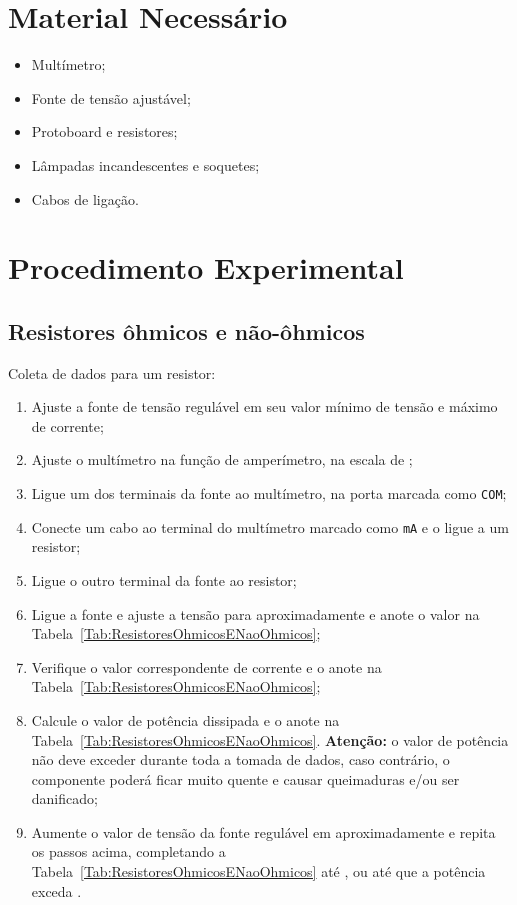 \section{Material Necessário}

\begin{itemize}
	\item Multímetro;
	\item Fonte de tensão ajustável;
	\item Protoboard e resistores;
	\item Lâmpadas incandescentes e soquetes; 
	\item Cabos de ligação.
\end{itemize}

\section{Procedimento Experimental}

\subsection{Resistores ôhmicos e não-ôhmicos}

Coleta de dados para um resistor:
\begin{enumerate}
	\item Ajuste a fonte de tensão regulável em seu valor mínimo de tensão e máximo de corrente; 
	\item Ajuste o multímetro na função de amperímetro, na escala de ;
	\item Ligue um dos terminais da fonte ao multímetro, na porta marcada como \texttt{COM};
	\item Conecte um cabo ao terminal do multímetro marcado como \texttt{mA} e o ligue a um resistor;
	\item Ligue o outro terminal da fonte ao resistor;
	\item Ligue a fonte e ajuste a tensão para aproximadamente  e anote o valor na Tabela~\ref{Tab:ResistoresOhmicosENaoOhmicos};
	\item Verifique o valor correspondente de corrente e o anote na Tabela~\ref{Tab:ResistoresOhmicosENaoOhmicos};
	\item Calcule o valor de potência dissipada e o anote na Tabela~\ref{Tab:ResistoresOhmicosENaoOhmicos}. \textbf{Atenção:} o valor de potência não deve exceder  durante toda a tomada de dados, caso contrário, o componente poderá ficar muito quente e causar queimaduras e/ou ser danificado;
	\item Aumente o valor de tensão da fonte regulável em aproximadamente  e repita os passos acima, completando a Tabela~\ref{Tab:ResistoresOhmicosENaoOhmicos} até , ou até que a potência exceda . 
\end{enumerate}

